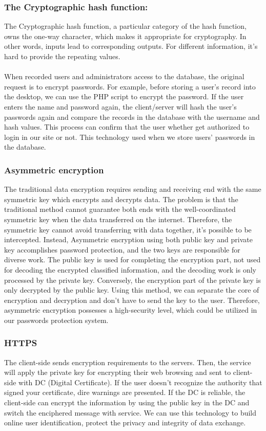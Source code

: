 \documentclass[onecolumn, draftclsnofoot,10pt, compsoc]{IEEEtran}
\begin{document}
\subsubsection{The Cryptographic hash function:}
 The Cryptographic hash function, a particular category of the hash function, owns the one-way character, which makes it appropriate for cryptography. In other words, inputs lead to corresponding outputs. For different information, it’s hard to provide the repeating values.\\
\\
    \indent When recorded users and administrators access to the database, the original request is to encrypt passwords. For example, before storing a user’s record into the desktop, we can use the PHP script to encrypt the password. If the user enters the name and password again, the client/server will hash the user’s passwords again and compare the records in the database with the username and hash values. This process can confirm that the user whether get authorized to login in our site or not. This technology used when we store users’ passwords in the database. \\
\subsubsection{Asymmetric encryption }
The traditional data encryption requires sending and receiving end with the same symmetric key which encrypts and decrypts data. The problem is that the traditional method cannot guarantee both ends with the well-coordinated symmetric key when the data transferred on the internet. Therefore, the symmetric key cannot avoid transferring with data together, it’s possible to be intercepted. Instead, Asymmetric encryption using both public key and private key accomplishes password protection, and the two keys are responsible for diverse work. The public key is used for completing the encryption part, not used for decoding the encrypted classified information, and the decoding work is only processed by the private key. Conversely, the encryption part of the private key is only decrypted by the public key. Using this method, we can separate the core of encryption and decryption and don’t have to send the key to the user. Therefore, asymmetric encryption possesses a high-security level, which could be utilized in our passwords protection system.
\subsubsection{HTTPS}
The client-side sends encryption requirements to the servers. Then, the service will apply the private key for encrypting their web browsing and sent to client-side with DC (Digital Certificate). If the user doesn't recognize the authority that signed your certificate, dire warnings are presented. If the DC is reliable, the client-side can encrypt the information by using the public key in the DC and switch the enciphered message with service. We can use this technology to build online user identification, protect the privacy and integrity of data exchange.
\end{document}
